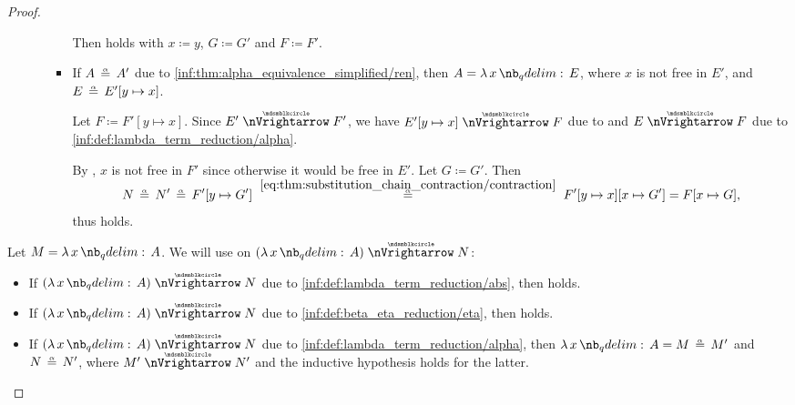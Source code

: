\begin{proof}
\begin{itemize}
\begin{itemize}
\begin{itemize}
        Then  holds with \( x \coloneqq y \), \( G \coloneqq G' \) and \( F \coloneqq F' \).

        \item If \( A \aequiv A' \) due to \ref{inf:thm:alpha_equivalence_simplified/ren}, then \( A = \qabs x E \), where \( x \) is not free in \( E' \), and \( E \aequiv E'[y \mapsto x] \).

        Let \( F \coloneqq F'[y \mapsto x] \). Since \( E' \ppred F' \), we have \( E'[y \mapsto x] \ppred F \) due to  and \( E \ppred F \) due to \ref{inf:def:lambda_term_reduction/alpha}.

        By , \( x \) is not free in \( F' \) since otherwise it would be free in \( E' \). Let \( G \coloneqq G' \). Then
        \begin{equation*}
          N
          \aequiv
          N'
          \aequiv
          F'[y \mapsto G']
          \reloset {\eqref{eq:thm:substitution_chain_contraction/contraction}} \aequiv
          F'[y \mapsto x][x \mapsto G']
          =
          F[x \mapsto G],
        \end{equation*}
        thus  holds.
      \end{itemize}
    \end{itemize}
  \end{itemize}

   Let \( M = \qabs x A \). We will use  on \( (\qabs x A) \ppred N \):
  \begin{itemize}
    \item If \( (\qabs x A) \ppred N \) due to \ref{inf:def:lambda_term_reduction/abs}, then  holds.

    \item If \( (\qabs x A) \ppred N \) due to \ref{inf:def:beta_eta_reduction/eta}, then  holds.

    \item If \( (\qabs x A) \ppred N \) due to \ref{inf:def:lambda_term_reduction/alpha}, then \( \qabs x A = M \aequiv M' \) and \( N \aequiv N' \), where \( M' \ppred N' \) and the inductive hypothesis holds for the latter.


\end{itemize}
\end{proof}
